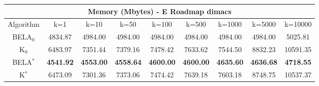 \begin{tabular}{c|cccccccc}\toprule
\multicolumn{9}{c}{Memory (Mbytes) - E Roadmap dimacs}\\ \midrule
Algorithm & k=1 & k=10 & k=50 & k=100 & k=500 & k=1000 & k=5000 & k=10000 \\ \midrule
BELA$_0$ & 4834.87 & 4984.00 & 4984.00 & 4984.00 & 4984.00 & 4984.00 & 4984.00 & 5025.81 \\
K$_0$ & 6483.97 & 7351.44 & 7379.16 & 7478.42 & 7633.62 & 7544.50 & 8832.23 & 10591.35 \\
BELA$^*$ & \textbf{4541.92} & \textbf{4553.00} & \textbf{4558.64} & \textbf{4600.00} & \textbf{4600.00} & \textbf{4635.60} & \textbf{4636.68} & \textbf{4718.55} \\
K$^*$ & 6473.09 & 7301.36 & 7373.06 & 7474.42 & 7639.18 & 7603.18 & 8748.75 & 10537.37 \\ \bottomrule 
\end{tabular}
